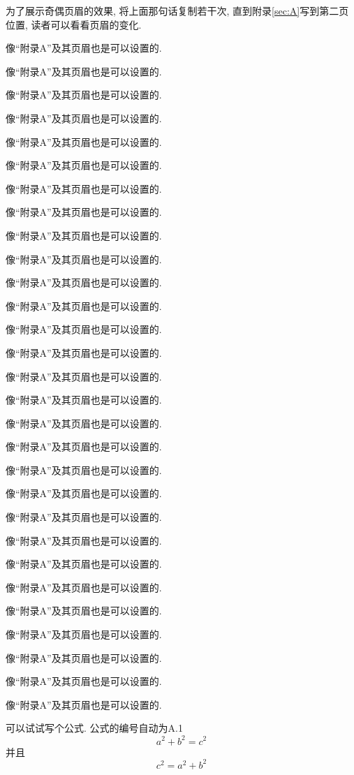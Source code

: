 \documentclass[a4paper]{article}
\begin{document}
为了展示奇偶页眉的效果, 将上面那句话复制若干次, 直到附录\ref{sec:A}写到第二页位置, 读者可以看看页眉的变化.

像``附录A''及其页眉也是可以设置的.

像``附录A''及其页眉也是可以设置的.

像``附录A''及其页眉也是可以设置的.

像``附录A''及其页眉也是可以设置的.

像``附录A''及其页眉也是可以设置的.

像``附录A''及其页眉也是可以设置的.

像``附录A''及其页眉也是可以设置的.

像``附录A''及其页眉也是可以设置的.

像``附录A''及其页眉也是可以设置的.

像``附录A''及其页眉也是可以设置的.

像``附录A''及其页眉也是可以设置的.

像``附录A''及其页眉也是可以设置的.

像``附录A''及其页眉也是可以设置的.

像``附录A''及其页眉也是可以设置的.

像``附录A''及其页眉也是可以设置的.

像``附录A''及其页眉也是可以设置的.

像``附录A''及其页眉也是可以设置的.

像``附录A''及其页眉也是可以设置的.

像``附录A''及其页眉也是可以设置的.

像``附录A''及其页眉也是可以设置的.

像``附录A''及其页眉也是可以设置的.

像``附录A''及其页眉也是可以设置的.

像``附录A''及其页眉也是可以设置的.

像``附录A''及其页眉也是可以设置的.

像``附录A''及其页眉也是可以设置的.

像``附录A''及其页眉也是可以设置的.

像``附录A''及其页眉也是可以设置的.

像``附录A''及其页眉也是可以设置的.

像``附录A''及其页眉也是可以设置的.

可以试试写个公式. 公式的编号自动为A.1
\begin{equation}\label{equ:A:1}
a^2+b^2=c^2
\end{equation}
并且
\begin{equation}\label{equ:A:2}
c^2=a^2+b^2
\end{equation}
\end{document}
